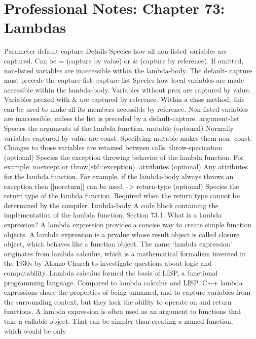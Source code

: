 \hypertarget{professional-notes-chapter-73-lambdas-1}{%
\chapter{Professional Notes: Chapter 73:
Lambdas}\label{professional-notes-chapter-73-lambdas-1}}

Parameter default-capture Details Species how all non-listed variables
are captured. Can be = (capture by value) or \& (capture by reference).
If omitted, non-listed variables are inaccessible within the
lambda-body. The default- capture must precede the capture-list.
capture-list Species how local variables are made accessible within the
lambda-body. Variables without prex are captured by value. Variables
prexed with \& are captured by reference. Within a class method, this
can be used to make all its members accessible by reference. Non-listed
variables are inaccessible, unless the list is preceded by a
default-capture. argument-list Species the arguments of the lambda
function. mutable (optional) Normally variables captured by value are
const. Specifying mutable makes them non- const. Changes to those
variables are retained between calls. throw-specication (optional)
Species the exception throwing behavior of the lambda function. For
example: noexcept or throw(std::exception). attributes (optional) Any
attributes for the lambda function. For example, if the lambda-body
always throws an exception then {[}{[}noreturn{]}{]} can be used.
-\textgreater{} return-type (optional) Species the return type of the
lambda function. Required when the return type cannot be determined by
the compiler. lambda-body A code block containing the implementation of
the lambda function. Section 73.1: What is a lambda expression? A lambda
expression provides a concise way to create simple function objects. A
lambda expression is a prvalue whose result object is called closure
object, which behaves like a function object. The name `lambda
expression' originates from lambda calculus, which is a mathematical
formalism invented in the 1930s by Alonzo Church to investigate
questions about logic and computability. Lambda calculus formed the
basis of LISP, a functional programming language. Compared to lambda
calculus and LISP, C++ lambda expressions share the properties of being
unnamed, and to capture variables from the surrounding context, but they
lack the ability to operate on and return functions. A lambda expression
is often used as an argument to functions that take a callable object.
That can be simpler than creating a named function, which would be only
